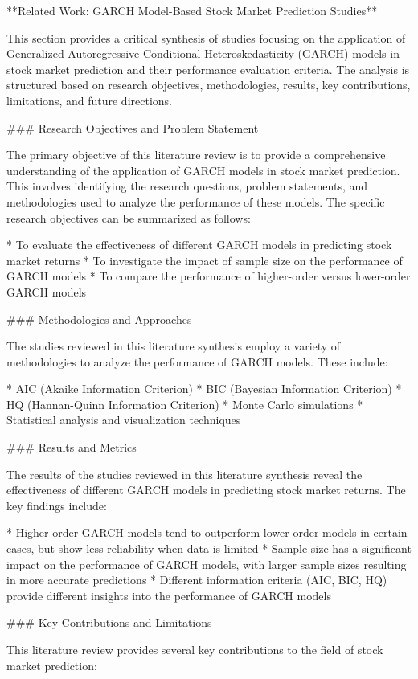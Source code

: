 \documentclass[conference]{IEEEtran}
\begin{document}
**Related Work: GARCH Model-Based Stock Market Prediction Studies**

This section provides a critical synthesis of studies focusing on the application of Generalized Autoregressive Conditional Heteroskedasticity (GARCH) models in stock market prediction and their performance evaluation criteria. The analysis is structured based on research objectives, methodologies, results, key contributions, limitations, and future directions.

\#\#\# Research Objectives and Problem Statement

The primary objective of this literature review is to provide a comprehensive understanding of the application of GARCH models in stock market prediction. This involves identifying the research questions, problem statements, and methodologies used to analyze the performance of these models. The specific research objectives can be summarized as follows:

* To evaluate the effectiveness of different GARCH models in predicting stock market returns
* To investigate the impact of sample size on the performance of GARCH models
* To compare the performance of higher-order versus lower-order GARCH models

\#\#\# Methodologies and Approaches

The studies reviewed in this literature synthesis employ a variety of methodologies to analyze the performance of GARCH models. These include:

* AIC (Akaike Information Criterion)
* BIC (Bayesian Information Criterion)
* HQ (Hannan-Quinn Information Criterion)
* Monte Carlo simulations
* Statistical analysis and visualization techniques

\#\#\# Results and Metrics

The results of the studies reviewed in this literature synthesis reveal the effectiveness of different GARCH models in predicting stock market returns. The key findings include:

* Higher-order GARCH models tend to outperform lower-order models in certain cases, but show less reliability when data is limited
* Sample size has a significant impact on the performance of GARCH models, with larger sample sizes resulting in more accurate predictions
* Different information criteria (AIC, BIC, HQ) provide different insights into the performance of GARCH models

\#\#\# Key Contributions and Limitations

This literature review provides several key contributions to the field of stock market prediction:
\end{document}
